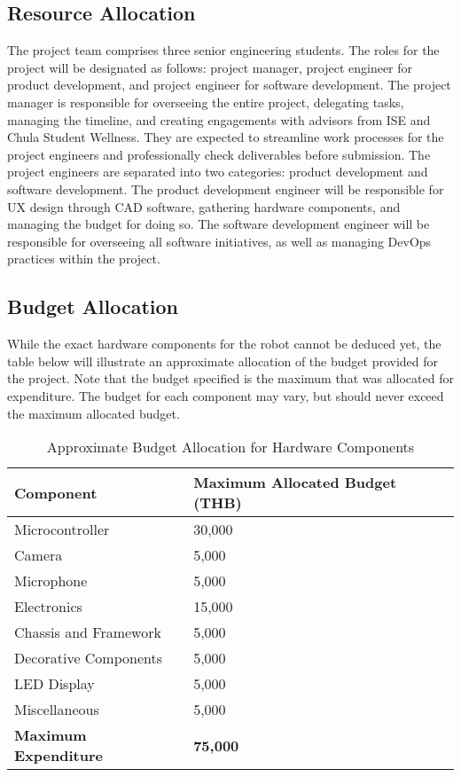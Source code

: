\subsection{Resource Allocation}

The project team comprises three senior engineering students. The roles for the project will be designated as follows: project manager, project engineer for product development, and project engineer for software development. The project manager is responsible for overseeing the entire project, delegating tasks, managing the timeline, and creating engagements with advisors from ISE and Chula Student Wellness. They are expected to streamline work processes for the project engineers and professionally check deliverables before submission. The project engineers are separated into two categories: product development and software development. The product development engineer will be responsible for UX design through CAD software, gathering hardware components, and managing the budget for doing so. The software development engineer will be responsible for overseeing all software initiatives, as well as managing DevOps practices within the project.

\subsection{Budget Allocation}

While the exact hardware components for the robot cannot be deduced yet, the table below will illustrate an approximate allocation of the budget provided for the project. Note that the budget specified is the maximum that was allocated for expenditure. The budget for each component may vary, but should never exceed the maximum allocated budget.

\begin{table}[ht]
\centering
\begin{tabular}{|l|l|}
\hline
\textbf{Component} & \textbf{Maximum Allocated Budget (THB)} \\ \hline
Microcontroller & 30,000 \\ \hline
Camera & 5,000 \\ \hline
Microphone & 5,000 \\ \hline
Electronics & 15,000 \\ \hline
Chassis and Framework & 5,000 \\ \hline
Decorative Components & 5,000 \\ \hline
LED Display & 5,000 \\ \hline
Miscellaneous & 5,000 \\ \hline
\textbf{Maximum Expenditure} & \textbf{75,000} \\ \hline
\end{tabular}
\caption{Approximate Budget Allocation for Hardware Components}
\end{table}

